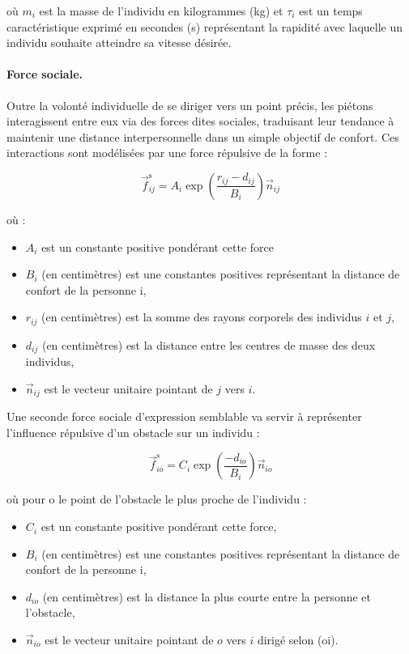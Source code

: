 \documentclass[a4paper,12pt]{article}
\begin{document}
où $m_i$ est la masse de l'individu en kilogrammes (kg) et $\tau_i$ est un temps caractéristique exprimé en secondes (s) représentant la rapidité avec laquelle un individu souhaite atteindre sa vitesse désirée.

\paragraph{Force sociale.}
Outre la volonté individuelle de se diriger vers un point précis, les piétons interagissent entre eux via des forces dites sociales, traduisant leur tendance à maintenir une distance interpersonnelle dans un simple objectif de confort. Ces interactions sont modélisées par une force répulsive de la forme :

\begin{equation}
\label{eq:force_sociale}
\vec{f}_{ij}^{\text{s}} = A_i \exp\left(\frac{r_{ij} - d_{ij}}{B_i}\right) \vec{n}_{ij}
\end{equation}

où :
\begin{itemize}
  \item $A_i$ est un constante positive pondérant cette force
  \item  $B_i$ (en centimètres) est une constantes positives représentant la distance de confort de la personne i,
  \item $r_{ij}$ (en centimètres) est la somme des rayons corporels des individus $i$ et $j$,
  \item $d_{ij}$ (en centimètres) est la distance entre les centres de masse des deux individus,
  \item $\vec{n}_{ij}$ est le vecteur unitaire pointant de $j$ vers $i$.
\end{itemize}

Une seconde force sociale d'expression semblable va servir à représenter l'influence répulsive d'un obstacle sur un individu :

\begin{equation}
\vec{f}_{io}^{\text{s}} = C_i \exp\left(\frac{- d_{io}}{B_i}\right) \vec{n}_{io}
\end{equation}

où pour o le point de l'obstacle le plus proche de l'individu :
\begin{itemize}
  \item $C_i$ est un constante positive pondérant cette force,
  \item  $B_i$ (en centimètres) est une constantes positives représentant la distance de confort de la personne i,
  \item $d_{io}$ (en centimètres) est la distance la plus courte entre la personne et l'obstacle,
  \item $\vec{n}_{io}$ est le vecteur unitaire pointant de $o$ vers $i$ dirigé selon (oi).
\end{itemize}
\end{document}
